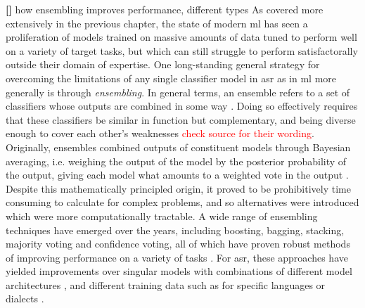\documentclass[thesis]{cluu}
\newcounter{paranum}
\newcommand{\numberedparagraph}{\par\refstepcounter{paranum}\textbf{[\theparanum] }}
\newcommand{\todo}[1]{\textcolor{red}{#1}}
\begin{document}
\parencite[inter alia]{barteldsMakingMoreLittle2023,zhangL2GENNeuralPhoneme2022,kheirAutomaticPronunciationAssessment2023,thaiSyntheticDataAugmentation2019}
\numberedparagraph{how ensembling improves performance, different types}
As covered more extensively in the previous chapter, the state of modern \gls{ml} has seen a proliferation of models trained on massive amounts of data tuned to perform well on a variety of target tasks, but which can still struggle to perform satisfactorally outside their domain of expertise. One long-standing general strategy for overcoming the limitations of any single classifier model in \gls{asr} as in \gls{ml} more generally is through \textit{ensembling}. In general terms, an ensemble refers to a set of classifiers whose outputs are combined in some way \parencite{dietterichEnsembleMethodsMachine2000}. Doing so effectively requires that these classifiers be similar in function but complementary, and being diverse enough to cover each other's weaknesses \parencite{hansenNeuralNetworkEnsembles1990}\todo{check source for their wording}. Originally, ensembles combined outputs of constituent models through Bayesian averaging, i.e. weighing the output of the model by the posterior probability of the output, giving each model what amounts to a weighted vote in the output \parencite{dietterichEnsembleMethodsMachine2000}. Despite this mathematically principled origin, it proved to be prohibitively time consuming to calculate for complex problems, and so alternatives were introduced which were more computationally tractable. A wide range of ensembling techniques have emerged over the years, including boosting, bagging, stacking, majority voting and confidence voting, all of which have proven robust methods of improving performance on a variety of tasks \parencite[see][inter alia]{maclinEmpiricalEvaluationBagging1997,dengScalableStackingLearning2012,fiscus1997post,gitmanConfidencebasedEnsemblesEndtoEnd2023}. For \gls{asr}, these approaches have yielded improvements over singular models with combinations of different model architectures \parencite{arunkumarInvestigationEnsembleFeatures2022,dengEnsembleDeepLearning2014}, and different training data such as for specific languages or dialects \parencite[inter alia]{agrawalLearningWhenTrust2023,gitmanConfidencebasedEnsemblesEndtoEnd2023}.
\end{document}
